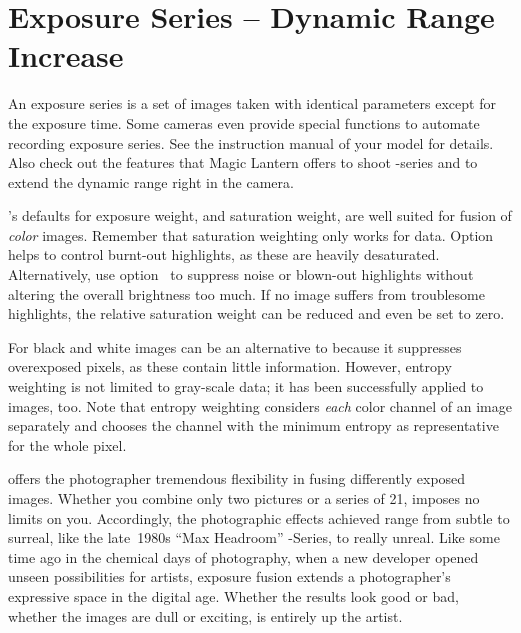 \section[Exposure Series -- Dynamic Range Increase]{\label{sec:exposure-series--dynamic-range-increase}%
  Exposure Series -- Dynamic Range Increase}


An exposure series is a set of images taken with identical parameters except for the exposure
time.  Some cameras even provide special functions to automate recording exposure series.  See
the instruction manual of your model for details.  Also check out the features that Magic
Lantern offers to shoot -series and to extend the dynamic range right in the
camera.

\App{}'s defaults for exposure weight,  and saturation weight,
 are well suited for fusion of \emph{color} images.  Remember
that saturation weighting only works for  data.
Option~ helps to control burnt-out highlights, as these are heavily
desaturated.  Alternatively, use option~ to suppress noise or
blown-out highlights without altering the overall brightness too much.  If no image suffers from
troublesome highlights, the relative saturation weight can be reduced and even be set to zero.

For black and white images  can be an alternative to
 because it suppresses overexposed pixels, as these contain little
information.  However, entropy weighting is not limited to gray-scale data; it has been
successfully applied to  images, too.  Note that entropy weighting considers
\emph{each} color channel of an  image separately and chooses the channel with the
minimum entropy as representative for the whole pixel.

\App{} offers the photographer tremendous flexibility in fusing differently exposed images.
Whether you combine only two pictures or a series of 21, \App{} imposes no limits on you.
Accordingly, the photographic effects achieved range from subtle to surreal, like the late~1980s
``Max Headroom'' -Series, to really unreal.  Like some time ago in the chemical days
of photography, when a new developer opened unseen possibilities for artists, exposure fusion
extends a photographer's expressive space in the digital age.  Whether the results look good or
bad, whether the images are dull or exciting, is entirely up the artist.

